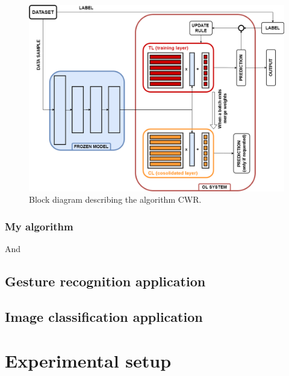 \documentclass[12pt]{report}
\begin{document}
\begin{figure}[h!]
    \centering
    \includegraphics[width=120mm]{Figures/Chapter3/CWR.png} 
    \caption{Block diagram describing the algorithm CWR.}
    \label{fig:block_diag_CWR}    
\end{figure}

\subsection{My algorithm}





And


\section{Gesture recognition application}

\section{Image classification application}





\chapter{Experimental setup}
\end{document}
